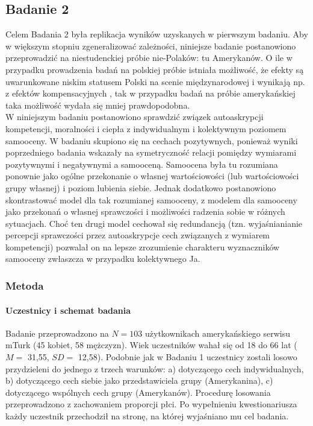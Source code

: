 \documentclass[man]{apa6}
\begin{document}
\newpage
\subsection{Badanie 2}
Celem Badania 2 była replikacja wyników uzyskanych w pierwszym badaniu. Aby w większym stopniu zgeneralizować zależności, niniejsze badanie postanowiono przeprowadzić na niestudenckiej próbie nie-Polaków: tu Amerykanów. O ile w przypadku prowadzenia badań na polskiej próbie istniała możliwość, że efekty są uwarunkowane niskim statusem Polski na scenie międzynarodowej i wynikają np. z efektów kompensacyjnych \parencite[zob. np.][]{judd2005fundamental}, tak w przypadku badań na próbie amerykańskiej taka możliwość wydała się mniej prawdopodobna.\\
W niniejszym badaniu postanowiono sprawdzić związek autoaskrypcji kompetencji, moralności i ciepła z indywidualnym i kolektywnym poziomem samooceny. W badaniu skupiono się na cechach pozytywnych, ponieważ wyniki poprzedniego badania wskazały na symetryczność relacji pomiędzy wymiarami pozytywnymi i negatywnymi a samooceną. Samoocena była tu rozumiana ponownie jako ogólne przekonanie o własnej wartościowości (lub wartościowości grupy własnej) i poziom lubienia siebie. Jednak dodatkowo postanowiono skontrastować model dla tak rozumianej samooceny, z modelem dla samooceny jako przekonań o własnej sprawczości i możliwości radzenia sobie w różnych sytuacjach. Choć ten drugi model cechował się redundancją (tzn. wyjaśnianianie percepcji sprawczości przez autoaskrypcje cech związanych z wymiarem kompetencji) pozwalał on na lepsze zrozumienie charakteru wyznaczników samooceny zwłaszcza w przypadku kolektywnego Ja.\\

\subsubsection{Metoda}

\paragraph{Uczestnicy i schemat badania}
Badanie przeprowadzono na $N=103$ użytkownikach amerykańskiego serwisu mTurk (45 kobiet, 58 mężczyzn). Wiek uczestników wahał się od 18 do 66 lat ($M=$ 31,55, $SD=$ 12,58). Podobnie jak w Badaniu 1 uczestnicy zostali losowo przydzieleni do jednego z trzech warunków: a) dotyczącego cech indywidualnych, b) dotyczącego cech siebie jako przedstawiciela grupy (Amerykanina), c) dotyczącego wspólnych cech grupy (Amerykanów). Procedurę losowania przeprowadzono z zachowaniem proporcji płci. Po wypełnieniu kwestionariusza każdy uczestnik przechodził na stronę, na której wyjaśniano mu cel badania.
\end{document}
